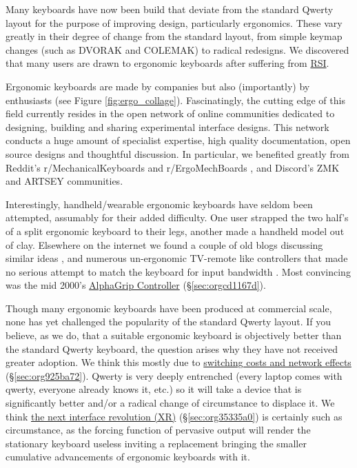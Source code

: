 \documentclass[logo,bsc,singlespacing,parskip]{infthesis}
\begin{document}
Many keyboards have now been build that deviate from the standard Qwerty layout for the purpose of improving design, particularly ergonomics.
These vary greatly in their degree of change from the standard layout, from simple keymap changes (such as DVORAK and COLEMAK) to radical redesigns.
We discovered that many users are drawn to ergonomic keyboards after suffering from \hyperref[orgafdb7af]{RSI}.

Ergonomic keyboards are made by companies but also (importantly) by enthusiasts (see Figure \ref{fig:ergo_collage}).
Fascinatingly, the cutting edge of this field currently resides in the open network of online communities dedicated to designing, building and sharing  experimental interface designs.
This network conducts a huge amount of specialist expertise, high quality documentation, open source designs and thoughtful discussion.
In particular, we benefited greatly from Reddit's r/MechanicalKeyboards \autocite{MechanicalKeyboardsAllClick} and  r/ErgoMechBoards \autocite{ErgoMechBoards} , and Discord's ZMK and ARTSEY communities.

Interestingly, handheld/wearable ergonomic keyboards have seldom been attempted, assumably for their added difficulty.
One user strapped the two half's of a split ergonomic keyboard to their legs, another made a handheld model out of clay.
Elsewhere on the internet we found a couple of old blogs discussing similar ideas \autocite{ChorditeAnotherOnehand}, and numerous un-ergonomic TV-remote like controllers that made no serious attempt to match the keyboard for input bandwidth \autocite{TwiddlerTekGear} .
Most convincing was the mid 2000's \hyperref[sec:orgcd1167d]{AlphaGrip Controller} (\S \ref{sec:orgcd1167d}).

Though many ergonomic keyboards have been produced at commercial scale, none has yet challenged the popularity of the standard Qwerty layout.
If you believe, as we do, that a suitable ergonomic keyboard is objectively better than the standard Qwerty keyboard, the question arises why they have not received greater adoption.
We think this mostly due to \hyperref[sec:org925ba72]{switching costs and network effects} (\S \ref{sec:org925ba72}).
Qwerty is very deeply entrenched (every laptop comes with qwerty, everyone already knows it, etc.) so it will take a device that is significantly better and/or a radical change of circumstance to displace it.
We think \hyperref[sec:org35335a0]{the next interface revolution (XR)} (\S \ref{sec:org35335a0}) is certainly such as circumstance, as the forcing function of pervasive output will render the stationary keyboard useless inviting a replacement bringing the smaller cumulative advancements of ergonomic keyboards with it.
\end{document}
